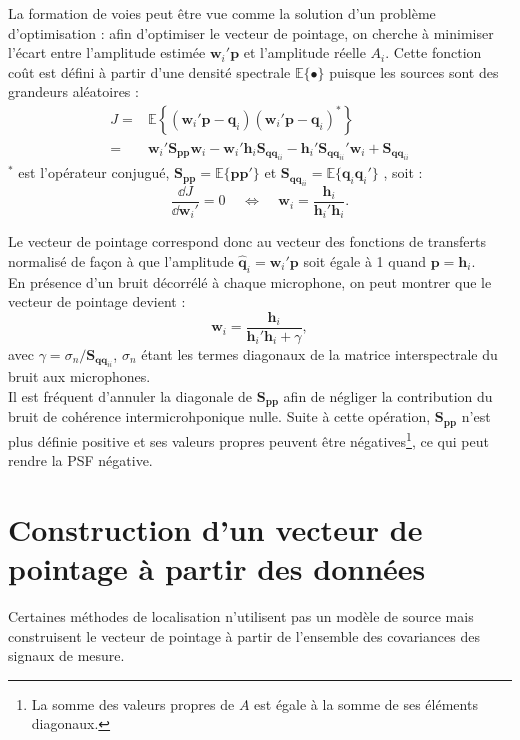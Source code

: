 La formation de voies peut être vue comme la solution d'un problème d'optimisation : afin d'optimiser le vecteur de pointage, on cherche à minimiser l'écart entre l'amplitude estimée $\bm{w}_i'\bm{p}$ et l'amplitude réelle $A_i$. Cette fonction coût est défini à partir d'une densité spectrale $\mathbb{E}\{\bullet\}$ puisque les sources sont des grandeurs aléatoires :
\begin{align}
	J=&\mathbb{E}\left\{ (\bm{w}_i'\bm{p}-\bm{q}_i)(\bm{w}_i'\bm{p}-\bm{q}_i)^* \right\}\\
	 =& \bm{w}_i'\bm{S_{pp}}\bm{w}_i-\bm{w}_i'\bm{h}_i\bm{S}_{\bm{qq}_{ii}}-\bm{h}_i'\bm{S}_{\bm{qq}_{ii}}'\bm{w}_i + \bm{S}_{\bm{qq}_{ii}}
\end{align}
$^*$ est l'opérateur conjugué, $\bm{S_{pp}}=\mathbb{E}\{\bm{p}\bm{p}'\}$ et $\bm{S}_{\bm{qq}_{ii}}=\mathbb{E}\{\bm{q}_i\bm{q}_i'\}$ , soit : 
\begin{equation}
	\frac{\dd J}{\dd \bm{w}_i'}=0 ~~~~~\Leftrightarrow ~~~~~ \bm{w}_i=\frac{\bm{h}_i}{\bm{h}_i'\bm{h}_i}.
\end{equation}

Le vecteur de pointage correspond donc au vecteur des fonctions de transferts normalisé de façon à que l'amplitude $\hat{\bm{q}}_i=\bm{w}_i'\bm{p}$ soit égale à 1 quand $\bm{p}=\bm{h}_i$.\\

En présence d'un bruit décorrélé à chaque microphone, on peut montrer que le vecteur de pointage devient : 
\begin{equation}
	\bm{w}_i=\frac{\bm{h}_i}{\bm{h}_i'\bm{h}_i+\gamma},
\end{equation}
avec $\gamma=\sigma_{n}/\bm{S}_{\bm{qq}_{ii}}$, $\sigma_{n}$ étant les termes diagonaux de la matrice interspectrale du bruit aux microphones.\\

Il est fréquent d'annuler la diagonale de $\bm{S_{pp}}$ afin de négliger la contribution du bruit de cohérence intermicrohponique nulle. Suite à cette opération, $\bm{S_{pp}}$  n'est plus définie positive et ses valeurs propres peuvent être négatives\footnote{La somme des valeurs propres de $A$ est égale à la somme de ses éléments diagonaux.}, ce qui peut rendre la PSF négative.




\section{Construction d'un vecteur de pointage à partir des données}
Certaines méthodes de localisation n'utilisent pas un modèle de source mais construisent le vecteur de pointage à partir de l'ensemble des covariances des signaux de mesure. \\
